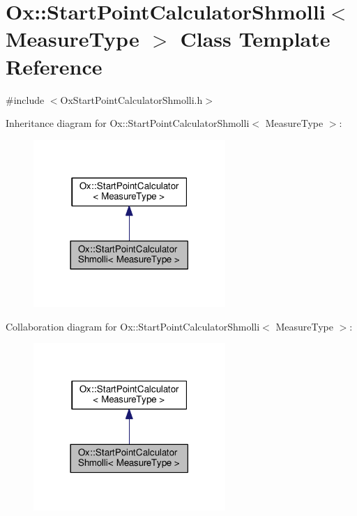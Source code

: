 \hypertarget{class_ox_1_1_start_point_calculator_shmolli}{\section{Ox\-:\-:Start\-Point\-Calculator\-Shmolli$<$ Measure\-Type $>$ Class Template Reference}
\label{class_ox_1_1_start_point_calculator_shmolli}
}


{\ttfamily \#include $<$Ox\-Start\-Point\-Calculator\-Shmolli.\-h$>$}



Inheritance diagram for Ox\-:\-:Start\-Point\-Calculator\-Shmolli$<$ Measure\-Type $>$\-:
\nopagebreak
\begin{figure}[H]
\begin{center}
\leavevmode
\includegraphics[width=206pt]{class_ox_1_1_start_point_calculator_shmolli__inherit__graph}
\end{center}
\end{figure}


Collaboration diagram for Ox\-:\-:Start\-Point\-Calculator\-Shmolli$<$ Measure\-Type $>$\-:
\nopagebreak
\begin{figure}[H]
\begin{center}
\leavevmode
\includegraphics[width=206pt]{class_ox_1_1_start_point_calculator_shmolli__coll__graph}
\end{center}
\end{figure}
